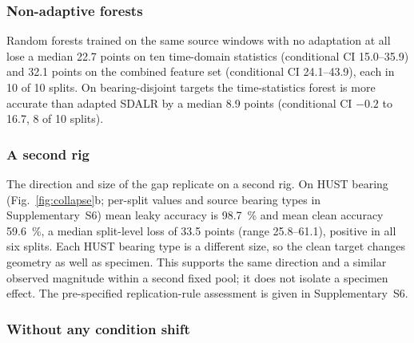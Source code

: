 \subsubsection{Non-adaptive forests}

Random forests \cite{pedregosa2011sklearn} trained on the same source windows with no adaptation at all lose a median 22.7
points on ten time-domain statistics (conditional CI 15.0--35.9) and 32.1 points on the combined feature set (conditional CI 24.1--43.9), each in 10
of 10 splits. On bearing-disjoint targets the time-statistics forest is more accurate than
adapted SDALR by a median 8.9 points (conditional CI $-0.2$ to 16.7, 8 of 10 splits).

\subsubsection{A second rig}

The direction and size of the gap replicate on a second rig. On HUST bearing (Fig.~\ref{fig:collapse}b; per-split values and source bearing types in Supplementary~S6) mean leaky accuracy
is \SI{98.7}{\percent} and mean clean accuracy \SI{59.6}{\percent}, a median split-level loss of 33.5 points (range 25.8--61.1), positive in all six splits. Each HUST bearing type is a different size, so the clean target changes geometry as well as specimen. This supports the same direction and a similar observed magnitude within a second fixed pool; it does not isolate a specimen effect. The pre-specified replication-rule assessment is given in Supplementary~S6.

\subsubsection{Without any condition shift}

